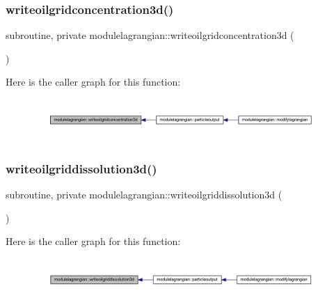 \subsubsection{\texorpdfstring{writeoilgridconcentration3d()}{writeoilgridconcentration3d()}}
{\footnotesize\ttfamily subroutine, private modulelagrangian\+::writeoilgridconcentration3d (\begin{DoxyParamCaption}{ }\end{DoxyParamCaption})\hspace{0.3cm}{\ttfamily [private]}}

Here is the caller graph for this function\+:\nopagebreak
\begin{figure}[H]
\begin{center}
\leavevmode
\includegraphics[width=350pt]{namespacemodulelagrangian_acf6d490f27a032fae7ae0cf84c95989b_icgraph}
\end{center}
\end{figure}
\mbox{\label{namespacemodulelagrangian_a31ce964f62f42f4eede762da9d6b5d88}} 
\subsubsection{\texorpdfstring{writeoilgriddissolution3d()}{writeoilgriddissolution3d()}}
{\footnotesize\ttfamily subroutine, private modulelagrangian\+::writeoilgriddissolution3d (\begin{DoxyParamCaption}{ }\end{DoxyParamCaption})\hspace{0.3cm}{\ttfamily [private]}}

Here is the caller graph for this function\+:\nopagebreak
\begin{figure}[H]
\begin{center}
\leavevmode
\includegraphics[width=350pt]{namespacemodulelagrangian_a31ce964f62f42f4eede762da9d6b5d88_icgraph}
\end{center}
\end{figure}
\mbox{\label{namespacemodulelagrangian_a8e2a2d0598e7ab5be827b9dd3693d75d}} 
